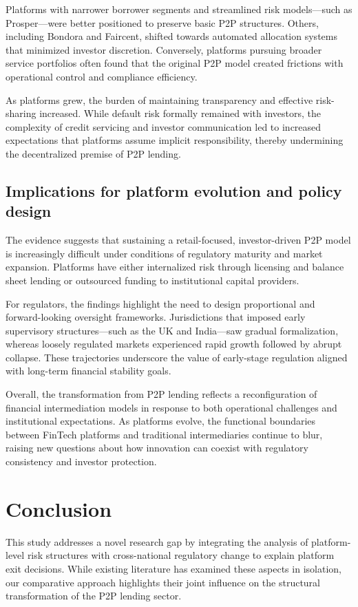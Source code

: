 \documentclass[pdflatex,sn-apa]{sn-jnl}%
\theoremstyle{thmstyleone}%
\theoremstyle{thmstyletwo}%
\theoremstyle{thmstylethree}%
\begin{document}
Platforms with narrower borrower segments and streamlined risk models—such as Prosper—were better positioned to preserve basic P2P structures. Others, including Bondora and Faircent, shifted towards automated allocation systems that minimized investor discretion. Conversely, platforms pursuing broader service portfolios often found that the original P2P model created frictions with operational control and compliance efficiency.

As platforms grew, the burden of maintaining transparency and effective risk-sharing increased. While default risk formally remained with investors, the complexity of credit servicing and investor communication led to increased expectations that platforms assume implicit responsibility, thereby undermining the decentralized premise of P2P lending.

\subsection{Implications for platform evolution and policy design}
The evidence suggests that sustaining a retail-focused, investor-driven P2P model is increasingly difficult under conditions of regulatory maturity and market expansion. Platforms have either internalized risk through licensing and balance sheet lending or outsourced funding to institutional capital providers. 

For regulators, the findings highlight the need to design proportional and forward-looking oversight frameworks. Jurisdictions that imposed early supervisory structures—such as the UK and India—saw gradual formalization, whereas loosely regulated markets experienced rapid growth followed by abrupt collapse. These trajectories underscore the value of early-stage regulation aligned with long-term financial stability goals.

Overall, the transformation from P2P lending reflects a reconfiguration of financial intermediation models in response to both operational challenges and institutional expectations. As platforms evolve, the functional boundaries between FinTech platforms and traditional intermediaries continue to blur, raising new questions about how innovation can coexist with regulatory consistency and investor protection.

\section{Conclusion}\label{sec13}

This study addresses a novel research gap by integrating the analysis of platform-level risk structures with cross-national regulatory change to explain platform exit decisions. While existing literature has examined these aspects in isolation, our comparative approach highlights their joint influence on the structural transformation of the P2P lending sector.
\end{document}
